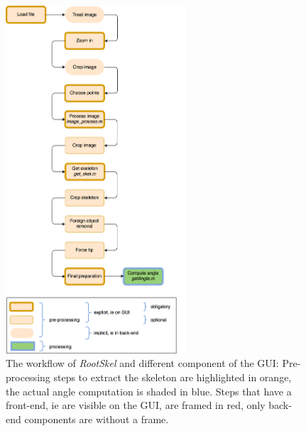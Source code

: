 
\begin{figure}[h]
	\centering
	\includegraphics[width=0.6\textwidth]{../Figures/workflow_big.png}
	\caption{The workflow of \textit{RootSkel} and different component of the GUI: Pre-processing steps to extract the skeleton are highlighted in orange, the actual angle computation is shaded in blue. Steps that have a front-end, ie are visible on the GUI, are framed in red, only back-end components are without a frame. }
	\label{fig:workflow}
\end{figure}


%
%
%
%
%
%
%
%



